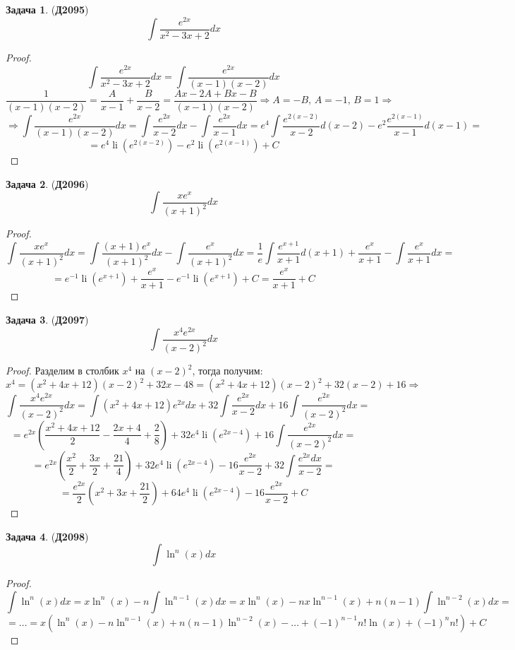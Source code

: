 \documentclass[12pt]{article}
\theoremstyle{definition}
\newtheorem{problem}{Задача}
\DeclareMathOperator{\dint}{\displaystyle\int}
\DeclareMathOperator{\li}{\operatorname{li}}
\begin{document}
\begin{problem}(\textbf{Д2095})
	$$
		\dint \dfrac{e^{2x}}{x^2 - 3x + 2}dx
	$$
\end{problem}
\begin{proof}
	$$
		\dint \dfrac{e^{2x}}{x^2 - 3x + 2}dx = \dint\dfrac{e^{2x}}{(x- 1)(x-2)}dx
	$$
	$$
		\dfrac{1}{(x - 1)(x - 2)} = \dfrac{A}{x- 1} + \dfrac{B}{x- 2} = \dfrac{Ax - 2A + Bx - B}{(x-1)(x-2)} \Rightarrow A = - B, \, A = - 1, \, B = 1 \Rightarrow
	$$
	$$
		\Rightarrow  \dint\dfrac{e^{2x}}{(x- 1)(x-2)}dx = \dint \dfrac{e^{2x}}{x - 2}dx - \dint \dfrac{e^{2x}}{x - 1}dx = e^4 \dint \dfrac{e^{2(x - 2)}}{x - 2}d(x-2) - e^2 \dfrac{e^{2(x - 1)}}{x - 1}d(x-1) =
	$$
	$$
		= e^4\li(e^{2(x-2)}) - e^2\li(e^{2(x-1)}) + C
	$$
\end{proof}
\newpage
\begin{problem}(\textbf{Д2096})
	$$
		\dint \dfrac{xe^x}{(x+1)^2}dx
	$$
\end{problem}
\begin{proof}
	$$
		\dint \dfrac{xe^x}{(x+1)^2}dx = \dint \dfrac{(x+1)e^x}{(x+1)^2}dx - \dint \dfrac{e^x}{(x+1)^2}dx = \dfrac{1}{e}\dint \dfrac{e^{x + 1}}{x+1}d(x +1) + \dfrac{e^x}{x +1} - \dint \dfrac{e^x}{x+1}dx=
	$$
	$$
		=e^{-1}\li(e^{x+1}) + \dfrac{e^x}{x + 1} - e^{-1}\li(e^{x + 1}) + C = \dfrac{e^x}{x + 1} + C
	$$
\end{proof}
\begin{problem}(\textbf{Д2097})
	$$
		\dint \dfrac{x^4e^{2x}}{(x-2)^2}dx
	$$
\end{problem}
\begin{proof}
	Разделим в столбик $x^4$ на $(x-2)^2$, тогда получим:
	$$
		x^4 = (x^2 + 4x + 12)(x-2)^2 + 32x - 48 = (x^2 + 4x + 12)(x-2)^2 + 32(x-2) + 16 \Rightarrow
	$$
	$$
		\dint \dfrac{x^4e^{2x}}{(x-2)^2}dx = \dint (x^2 + 4x + 12)e^{2x}dx + 32\dint\dfrac{e^{2x}}{x - 2}dx + 16 \dint \dfrac{e^{2x}}{(x - 2)^2}dx= 
	$$
	$$
		= e^{2x}\left(\dfrac{x^2 + 4x + 12}{2} - \dfrac{2x +4}{4} + \dfrac{2}{8}\right) + 32e^{4}\li\left(e^{2x - 4}\right) + 16 \dint \dfrac{e^{2x}}{(x - 2)^2}dx= 
	$$
	$$
		=e^{2x}\left(\dfrac{x^2}{2} + \dfrac{3x}{2} + \dfrac{21}{4}\right) + 32e^{4}\li\left(e^{2x - 4}\right) - 16 \dfrac{e^{2x}}{x - 2} + 32 \dint\dfrac{e^{2x}dx}{x -2} = 
	$$
	$$
		= \dfrac{e^{2x}}{2}\left(x^2 + 3x + \dfrac{21}{2}\right) + 64e^{4}\li\left(e^{2x - 4}\right)- 16 \dfrac{e^{2x}}{x - 2} + C
	$$
\end{proof}
\begin{problem}(\textbf{Д2098})
	$$
		\dint \ln^n(x)dx 
	$$
\end{problem}
\begin{proof}
	$$
		\dint \ln^n(x)dx = x\ln^n(x) - n\dint \ln^{n-1}(x)dx = x\ln^n(x) - nx\ln^{n-1}(x) + n(n-1)\dint \ln^{n-2}(x)dx =
	$$
	$$
		=\dotsc = x(\ln^n(x) - n\ln^{n-1}(x) + n(n-1)\ln^{n-2}(x) - \dotsc + (-1)^{n-1}n!\ln(x) + (-1)^n n!) + C
	$$
\end{proof}
\end{document}
